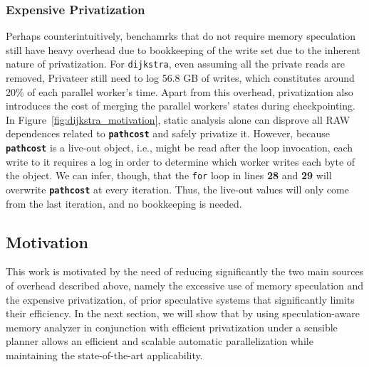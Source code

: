 \subsubsection{Expensive Privatization}
\label{sec:excessive-priv}
Perhaps counterintuitively, benchamrks that do not require memory
speculation still have heavy overhead due to bookkeeping of the write set
due to the inherent nature of privatization. For \texttt{dijkstra}, even
assuming all the private reads are removed, Privateer still need to log
56.8 GB of writes, which constitutes around 20\% of each parallel worker's
time. Apart from this overhead, privatization also introduces the cost of
merging the parallel workers' states during checkpointing. In
Figure~\ref{fig:dijkstra_motivation}, static analysis alone can disprove
all RAW dependences related to \texttt{\textbf{pathcost}} and safely
privatize it. However, because \texttt{\textbf{pathcost}} is a live-out
object, i.e., might be read after the loop invocation, each write to it
requires a log in order to determine which worker writes each byte of the
object. We can infer, though, that the \texttt{for} loop in lines
\textbf{28} and \textbf{29} will overwrite \texttt{\textbf{pathcost}} at
every iteration. Thus, the live-out values will only come from the last
iteration, and no bookkeeping is needed.

\subsection{Motivation}
This work is motivated by the need of reducing significantly the two main
sources of overhead described above, namely the excessive use of memory
speculation and the expensive privatization, of prior speculative systems
that significantly limits their efficiency.
%
In the next section, we will show that by using speculation-aware memory
analyzer in conjunction with efficient privatization under a sensible
planner allows an efficient and scalable automatic parallelization while
maintaining the state-of-the-art applicability.



